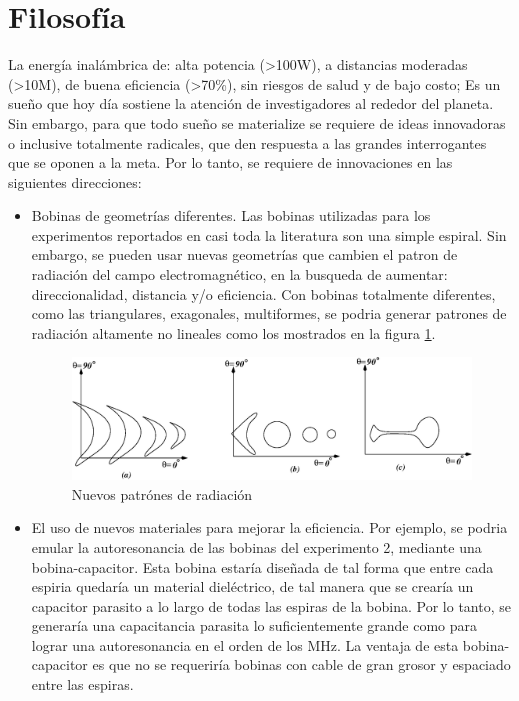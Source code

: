 \documentclass{intech}
\begin{document}
\section{Filosof{\'i}a}
La energ{\'i}a inal\'ambrica de: alta potencia (>100W), a distancias moderadas (>10M), de buena eficiencia (>70\%), sin riesgos de salud y de bajo costo; Es un sue\~no que hoy d{\'i}a sostiene la atenci\'on de investigadores al rededor del planeta. 
Sin embargo, para que todo sue\~no se materialize se requiere de ideas innovadoras o inclusive totalmente radicales, que den respuesta  a las grandes interrogantes que se oponen a la meta. Por lo tanto, se requiere de innovaciones en las siguientes direcciones:
\begin{itemize}
\item Bobinas de geometr{\'i}as diferentes. Las bobinas utilizadas para los experimentos reportados en casi toda la literatura son una simple espiral.  Sin embargo, se pueden usar nuevas geometr{\'i}as que cambien el patron de radiaci\'on
del campo electromagn\'etico, en la busqueda de aumentar: direccionalidad, distancia y/o eficiencia.
Con bobinas totalmente diferentes, como las triangulares, exagonales, multiformes, se podria generar patrones de radiaci\'on altamente no lineales como los mostrados en la figura  \ref{patronloco}.
\begin{figure}[hbtp]
\centering
\includegraphics[width=12cm]{img/patrones.eps}
\caption{Nuevos patr\'ones de radiaci\'on}
\label{patronloco}
\end{figure}
\item El uso de nuevos materiales para mejorar la eficiencia. Por ejemplo, se podria emular la autoresonancia de las bobinas
del experimento 2, mediante una bobina-capacitor. Esta bobina estar{\'i}a dise\~nada de tal forma que entre cada espiria quedar{\'ia} un material diel\'ectrico, de tal manera que se crear{\'i}a un capacitor parasito a lo largo de todas las espiras de la bobina. Por lo tanto, se generar{\'i}a una capacitancia parasita lo suficientemente grande como para lograr una autoresonancia en el orden de los MHz.
La ventaja de esta bobina-capacitor es que no se requerir{\'i}a bobinas con cable de gran grosor y espaciado entre las espiras.

\end{itemize}
\end{document}
